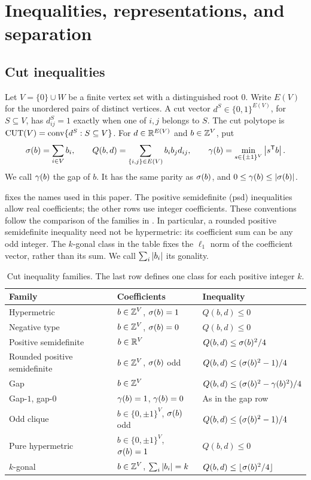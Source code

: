 \section{Inequalities, representations, and separation}\label{sec:preliminaries}

\subsection{Cut inequalities}

Let $V=\{0\}\cup W$ be a finite vertex set with a distinguished root $0$.
Write $E(V)$ for the unordered pairs of distinct vertices.  A cut vector
$d^S\in\{0,1\}^{E(V)}$, for $S\subseteq V$, has $d^S_{ij}=1$ exactly when
one of $i,j$ belongs to $S$.  The cut polytope is
$\operatorname{CUT}(V)=\operatorname{conv}\{d^S:S\subseteq V\}$.
For $d\in\mathbb R^{E(V)}$ and $b\in\mathbb Z^V$, put
\begin{equation}\label{eq:cut-forms}
 \sigma(b)=\sum_{i\in V}b_i,\qquad
 Q(b,d)=\sum_{\{i,j\}\in E(V)}b_i b_jd_{ij},\qquad
 \gamma(b)=\min_{s\in\{\pm1\}^V}\left\lvert s^{\mathsf T} b\right\rvert.
\end{equation}
We call $\gamma(b)$ the gap of $b$.  It has the same parity as $\sigma(b)$,
and $0\leq\gamma(b)\leq\left\lvert \sigma(b)\right\rvert$.

 fixes the names used in this paper.  The positive
semidefinite (psd) inequalities allow real coefficients; the other rows use
integer coefficients.  These conventions follow the comparison of the
families in \citet{GKL2012}.  In particular, a rounded positive
semidefinite inequality need not be hypermetric: its coefficient sum can
be any odd integer.  The $k$-gonal class in the table fixes the
$\ell_1$ norm of the coefficient vector, rather than its sum.
We call $\sum_i\left\lvert b_i\right\rvert$ its gonality.

\begin{table}[t]
\centering\small
\caption{Cut inequality families.  The last row defines one class for each
positive integer $k$.}\label{tab:classes}
\begin{tabular}{@{}lll@{}}
\toprule
Family & Coefficients & Inequality\\
\midrule
Hypermetric & $b\in\mathbb Z^V$, $\sigma(b)=1$ & $Q(b,d)\leq0$\\
Negative type & $b\in\mathbb Z^V$, $\sigma(b)=0$ & $Q(b,d)\leq0$\\
Positive semidefinite & $b\in\mathbb R^V$ & $Q(b,d)\leq\sigma(b)^2/4$\\
Rounded positive semidefinite & $b\in\mathbb Z^V$, $\sigma(b)$ odd
 & $Q(b,d)\leq(\sigma(b)^2-1)/4$\\
Gap & $b\in\mathbb Z^V$ & $Q(b,d)\leq(\sigma(b)^2-\gamma(b)^2)/4$\\
Gap-$1$, gap-$0$ & $\gamma(b)=1$, $\gamma(b)=0$ & As in the gap row\\
Odd clique & $b\in\{0,\pm1\}^V$, $\sigma(b)$ odd
 & $Q(b,d)\leq(\sigma(b)^2-1)/4$\\
Pure hypermetric & $b\in\{0,\pm1\}^V$, $\sigma(b)=1$ & $Q(b,d)\leq0$\\
$k$-gonal & $b\in\mathbb Z^V$, $\sum_i\left\lvert b_i\right\rvert=k$
 & $Q(b,d)\leq\lfloor\sigma(b)^2/4\rfloor$\\
\bottomrule
\end{tabular}
\end{table}

